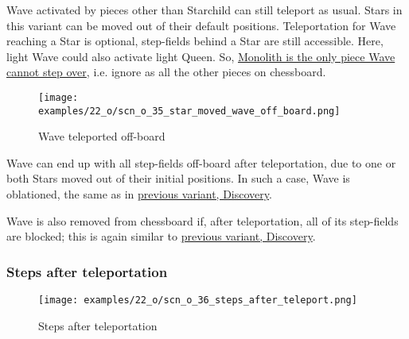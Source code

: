 \vspace*{-0.5\baselineskip}
Wave activated by pieces other than Starchild can still teleport as usual. Stars
in this variant can be moved out of their default positions. Teleportation for
Wave reaching a Star is optional, step-fields behind a Star are still accessible.
Here, light Wave could also activate light Queen. So,
\hyperref[fig:scn_d_14_teleport_wave_via_monolith]{Monolith is the only piece Wave cannot step over},
i.e. ignore as all the other pieces on chessboard.

\clearpage %

\vspace*{-2.1\baselineskip}
\noindent
\begin{figure}[!h]
\texttt{[image: examples/22\_o/scn\_o\_35\_star\_moved\_wave\_off\_board.png]}
\caption{Wave teleported off-board}
\label{fig:scn_o_35_star_moved_wave_off_board}
\end{figure}

Wave can end up with all step-fields off-board after teleportation, due to one or
both Stars moved out of their initial positions. In such a case, Wave is oblationed,
the same as in
\hyperref[fig:scn_d_16_wave_teleported_off_board]{previous variant, Discovery}.

Wave is also removed from chessboard if, after teleportation, all of its step-fields
are blocked; this is again similar to
\hyperref[fig:scn_d_15_teleported_wave_blocked]{previous variant, Discovery}.

\clearpage %

\subsubsection*{Steps after teleportation}
\label{sec:One/Starchild/Activating Wave/Steps after teleportation}

\vspace*{-1.5\baselineskip}
\noindent
\begin{figure}[!h]
\texttt{[image: examples/22\_o/scn\_o\_36\_steps\_after\_teleport.png]}
\vspace*{-1.4\baselineskip}
\caption{Steps after teleportation}
\label{fig:scn_o_36_steps_after_teleport}
\end{figure}

